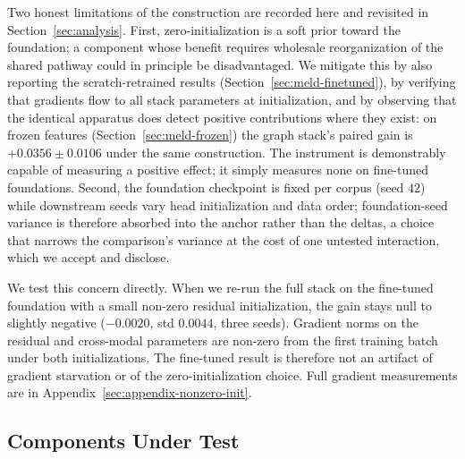 Two honest limitations of the construction are recorded here and revisited in Section~\ref{sec:analysis}. First, zero-initialization is a soft prior toward the foundation; a component whose benefit requires wholesale reorganization of the shared pathway could in principle be disadvantaged. We mitigate this by also reporting the scratch-retrained results (Section~\ref{sec:meld-finetuned}), by verifying that gradients flow to all stack parameters at initialization, and by observing that the identical apparatus does detect positive contributions where they exist: on frozen features (Section~\ref{sec:meld-frozen}) the graph stack's paired gain is $+0.0356 \pm 0.0106$ under the same construction. The instrument is demonstrably capable of measuring a positive effect; it simply measures none on fine-tuned foundations. Second, the foundation checkpoint is fixed per corpus (seed $42$) while downstream seeds vary head initialization and data order; foundation-seed variance is therefore absorbed into the anchor rather than the deltas, a choice that narrows the comparison's variance at the cost of one untested interaction, which we accept and disclose.

We test this concern directly. When we re-run the full stack on the fine-tuned foundation with a small non-zero residual initialization, the gain stays null to slightly negative ($-0.0020$, std $0.0044$, three seeds). Gradient norms on the residual and cross-modal parameters are non-zero from the first training batch under both initializations. The fine-tuned result is therefore not an artifact of gradient starvation or of the zero-initialization choice. Full gradient measurements are in Appendix~\ref{sec:appendix-nonzero-init}.

\subsection{Components Under Test}
\label{sec:components-under-test}

